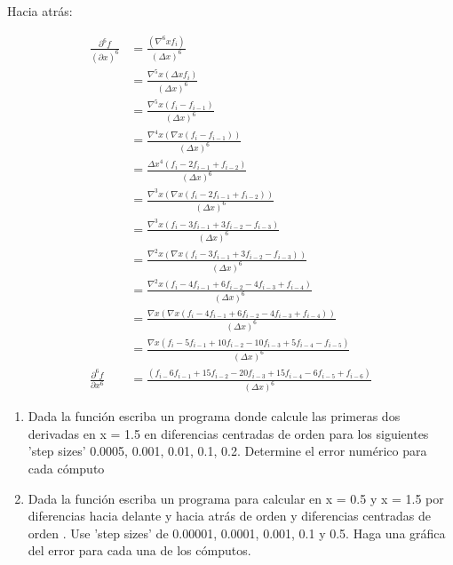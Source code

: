 \documentclass{article}
\begin{document}
Hacia atr\'{a}s:%

\begin{align*}
\frac{\partial^{6}f}{\left(  \partial x\right)  ^{6}}  & =\frac{\left(
\nabla^{6}xf_{i}\right)  }{\left(  \Delta x\right)  ^{6}}\\
& =\frac{\nabla^{5}x\left(  \Delta xf_{i}\right)  }{\left(  \Delta x\right)
^{6}}\\
& =\frac{\nabla^{5}x\left(  f_{i}-f_{i-1}\right)  }{\left(  \Delta x\right)
^{6}}\\
& =\frac{\nabla^{4}x\left(  \nabla x\left(  f_{i}-f_{i-1}\right)  \right)
}{\left(  \Delta x\right)  ^{6}}\\
& =\frac{\Delta x^{4}\left(  f_{i}-2f_{i-1}+f_{i-2}\right)  }{\left(  \Delta
x\right)  ^{6}}\\
& =\frac{\nabla^{3}x\left(  \nabla x\left(  f_{i}-2f_{i-1}+f_{i-2}\right)
\right)  }{\left(  \Delta x\right)  ^{6}}\\
& =\frac{\nabla^{3}x\left(  f_{i}-3f_{i-1}+3f_{i-2}-f_{i-3}\right)  }{\left(
\Delta x\right)  ^{6}}\\
& =\frac{\nabla^{2}x\left(  \nabla x\left(  f_{i}-3f_{i-1}+3f_{i-2}%
-f_{i-3}\right)  \right)  }{\left(  \Delta x\right)  ^{6}}\\
& =\frac{\nabla^{2}x\left(  f_{i}-4f_{i-1}+6f_{i-2}-4f_{i-3}+f_{i-4}\right)
}{\left(  \Delta x\right)  ^{6}}\\
& =\frac{\nabla x\left(  \nabla x\left(  f_{i}-4f_{i-1}+6f_{i-2}%
-4f_{i-3}+f_{i-4}\right)  \right)  }{\left(  \Delta x\right)  ^{6}}\\
& =\frac{\nabla x\left(  f_{i}-5f_{i-1}+10f_{i-2}-10f_{i-3}+5f_{i-4}%
-f_{i-5}\right)  }{\left(  \Delta x\right)  ^{6}}\\
\frac{\partial^{6}f}{\partial x^{6}}  & =\frac{\left(  f_{i-}6f_{i-1}%
+15f_{i-2}-20f_{i-3}+15f_{i-4}-6f_{i-5}+f_{i-6}\right)  }{\left(  \Delta
x\right)  ^{6}}%
\end{align*}

\begin{enumerate}
\item  Dada la funci\'{o}n escriba un programa donde calcule las primeras dos
derivadas en x = 1.5 en diferencias centradas de orden para los siguientes
'step sizes' 0.0005, 0.001, 0.01, 0.1, 0.2. Determine el error num\'{e}rico
para cada c\'{o}mputo

\item  Dada la funci\'{o}n escriba un programa para calcular en x = 0.5 y x =
1.5 por diferencias hacia delante y hacia atr\'{a}s de orden y diferencias
centradas de orden . Use 'step sizes' de 0.00001, 0.0001, 0.001, 0.1 y 0.5.
Haga una gr\'{a}fica del error para cada una de los c\'{o}mputos.
\end{enumerate}
\end{document}
